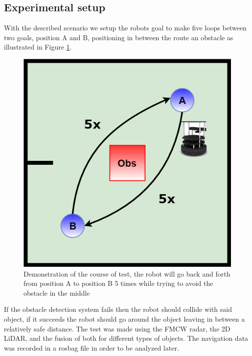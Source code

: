 \subsection{Experimental setup}
With the described scenario we setup the robots goal to make five loops between two goals, position A and B, positioning in between the route an obstacle as illustrated in  Figure \ref{fig:exp}. 
\begin{figure}[ht!]
\centerline{\includegraphics [width=0.5 \textwidth]{imgs/chapter5/exp.png}}
\caption{Demonstration of the course of test, the robot will go back and forth from position A to position B 5 times while  trying to avoid the obstacle in the middle}
\label{fig:exp}
\end{figure}

If the obstacle detection system fails then the robot should collide with said object, if it succeeds the robot should go around the object leaving in between a relatively safe distance. The test was made using the \ac{FMCW} radar, the 2D \ac{LiDAR}, and the fusion of both for different types of objects. The  navigation data was recorded in a rosbag file in order to be analyzed later.

